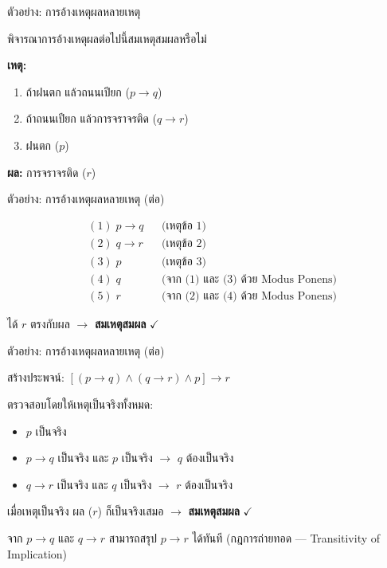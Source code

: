 \documentclass[11pt, aspectratio=169]{beamer}
\begin{document}
\begin{frame}{ตัวอย่าง: การอ้างเหตุผลหลายเหตุ}
  \begin{exambox}[โจทย์]
    พิจารณาการอ้างเหตุผลต่อไปนี้สมเหตุสมผลหรือไม่

    \textbf{เหตุ:}
    \begin{enumerate}
      \item ถ้าฝนตก แล้วถนนเปียก \quad ($p \to q$)
      \item ถ้าถนนเปียก แล้วการจราจรติด \quad ($q \to r$)
      \item ฝนตก \quad ($p$)
    \end{enumerate}
    \textbf{ผล:} การจราจรติด \quad ($r$)
  \end{exambox}
\end{frame}

\begin{frame}{ตัวอย่าง: การอ้างเหตุผลหลายเหตุ (ต่อ)}
  \begin{solbox}
    \begin{align*}
      &(1)\; p \to q    &&\text{(เหตุข้อ 1)} \\
      &(2)\; q \to r    &&\text{(เหตุข้อ 2)} \\
      &(3)\; p          &&\text{(เหตุข้อ 3)} \\
      &(4)\; q          &&\text{(จาก (1) และ (3) ด้วย Modus Ponens)} \\
      &(5)\; r          &&\text{(จาก (2) และ (4) ด้วย Modus Ponens)}
    \end{align*}

    ได้ $r$ ตรงกับผล $\rightarrow$ \textbf{สมเหตุสมผล} $\checkmark$
  \end{solbox}
\end{frame}

\begin{frame}{ตัวอย่าง: การอ้างเหตุผลหลายเหตุ (ต่อ)}
  \begin{solbox}
    สร้างประพจน์: $[(p \to q) \land (q \to r) \land p] \to r$

    ตรวจสอบโดยให้เหตุเป็นจริงทั้งหมด:
    \begin{itemize}
      \item $p$ เป็นจริง
      \item $p \to q$ เป็นจริง และ $p$ เป็นจริง $\rightarrow$ $q$ ต้องเป็นจริง
      \item $q \to r$ เป็นจริง และ $q$ เป็นจริง $\rightarrow$ $r$ ต้องเป็นจริง
    \end{itemize}
    เมื่อเหตุเป็นจริง ผล ($r$) ก็เป็นจริงเสมอ $\rightarrow$ \textbf{สมเหตุสมผล} $\checkmark$
  \end{solbox}

  \begin{intuition}
    จาก $p \to q$ และ $q \to r$ สามารถสรุป $p \to r$ ได้ทันที
    (กฎการถ่ายทอด — Transitivity of Implication)
  \end{intuition}
\end{frame}
\end{document}
